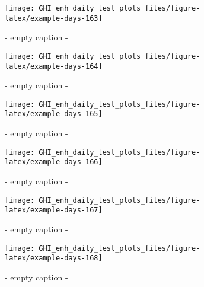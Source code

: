\documentclass[
  10pt,
  a4paper,oneside]{article}
\begin{document}
\begin{figure}[H]

{\centering \texttt{[image: GHI\_enh\_daily\_test\_plots\_files/figure-latex/example-days-163]} 

}

\caption{ - empty caption - }\label{fig:example-days-163}
\end{figure}

\begin{figure}[H]

{\centering \texttt{[image: GHI\_enh\_daily\_test\_plots\_files/figure-latex/example-days-164]} 

}

\caption{ - empty caption - }\label{fig:example-days-164}
\end{figure}

\begin{figure}[H]

{\centering \texttt{[image: GHI\_enh\_daily\_test\_plots\_files/figure-latex/example-days-165]} 

}

\caption{ - empty caption - }\label{fig:example-days-165}
\end{figure}

\begin{figure}[H]

{\centering \texttt{[image: GHI\_enh\_daily\_test\_plots\_files/figure-latex/example-days-166]} 

}

\caption{ - empty caption - }\label{fig:example-days-166}
\end{figure}

\begin{figure}[H]

{\centering \texttt{[image: GHI\_enh\_daily\_test\_plots\_files/figure-latex/example-days-167]} 

}

\caption{ - empty caption - }\label{fig:example-days-167}
\end{figure}

\begin{figure}[H]

{\centering \texttt{[image: GHI\_enh\_daily\_test\_plots\_files/figure-latex/example-days-168]} 

}

\caption{ - empty caption - }\label{fig:example-days-168}
\end{figure}
\end{document}
